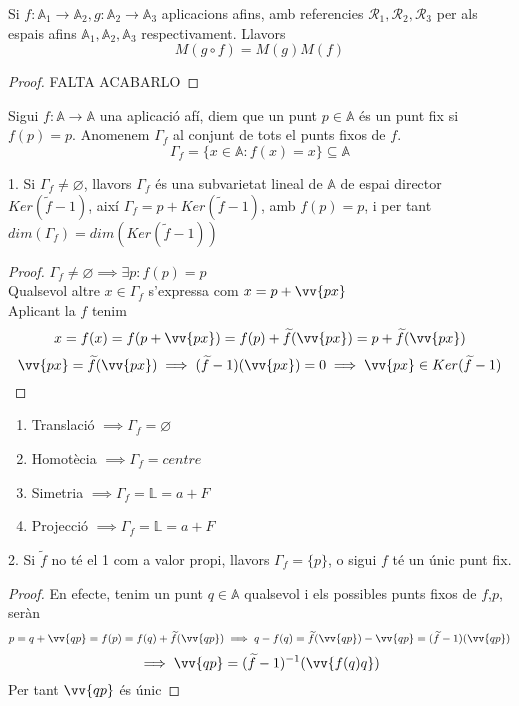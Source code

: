 \begin{lem}
	Si $f:\mathbb{A}_1\to\mathbb{A}_2,g:\mathbb{A}_2\to\mathbb{A}_3$ aplicacions afins, amb referencies $\mathcal{R}_1,\mathcal{R}_2,\mathcal{R}_3$ per als espais afins $\mathbb{A}_1,\mathbb{A}_2,\mathbb{A}_3$ respectivament. Llavors
	\[M(g\circ f)=M(g)M(f)\]
\end{lem}
\begin{proof}
	FALTA ACABARLO
\end{proof}

\begin{defn}
	Sigui $f:\mathbb{A}\to\mathbb{A}$ una aplicació afí, diem que un punt $p\in\mathbb{A}$ és un punt fix si $f(p)=p$. Anomenem $\Gamma_f$ al conjunt de tots el punts fixos de $f$.
	\[\Gamma_f=\{x\in\mathbb{A}:f(x)=x\}\subseteq\mathbb{A}\]
\end{defn}

\begin{prop}1.
	Si $\Gamma_f\neq\varnothing$, llavors $\Gamma_f$ és una subvarietat lineal de $\mathbb{A}$ de espai director $Ker(\widetilde{f}-1)$, així $\Gamma_f=p+Ker(\widetilde{f}-1)$, amb $f(p)=p$, i per tant $dim(\Gamma_f)=dim(Ker(\widetilde{f}-1))$
\end{prop}
\begin{proof}
	$\Gamma_f\neq\varnothing\implies\exists p:f(p)=p$ \\
	Qualsevol altre $x\in\Gamma_f$ s'expressa com $x=p+\vv{px}$ \\
	Aplicant la $f$ tenim
	\[x=f(x)=f(p+\vv{px})=f(p)+\widetilde{f}(\vv{px})=p+\widetilde{f}(\vv{px})\]
	\[\vv{px}=\widetilde{f}(\vv{px})\implies(\widetilde{f}-1)(\vv{px})=0\implies\vv{px}\in Ker(\widetilde{f}-1)\]
\end{proof}

\begin{exmp}\begin{enumerate}
	\item Translació $\implies\Gamma_f=\varnothing$
	\item Homotècia $\implies\Gamma_f=centre$
	\item Simetria $\implies\Gamma_f=\mathbb{L}=a+F$
	\item Projecció $\implies\Gamma_f=\mathbb{L}=a+F$
\end{enumerate}\end{exmp}

\begin{prop}2.
	Si $\widetilde{f}$ no té el 1 com a valor propi, llavors $\Gamma_f=\{p\}$, o sigui $f$ té un únic punt fix.
\end{prop}
\begin{proof}
	En efecte, tenim un punt $q\in\mathbb{A}$ qualsevol i els possibles punts fixos de $f$,$p$, seràn
	\[p=q+\vv{qp}=f(p)=f(q)+\widetilde{f}(\vv{qp})\implies q-f(q)=\widetilde{f}(\vv{qp})-\vv{qp}=(\widetilde{f}-1)(\vv{qp})\]
	\[\implies \vv{qp}=(\widetilde{f}-1)^{-1}(\vv{f(q)q})\]
	Per tant $\vv{qp}$ és únic
\end{proof}

